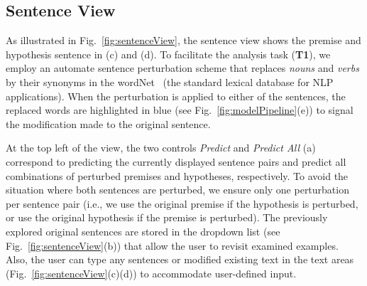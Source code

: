 
\subsection{Sentence View}
\label{sec:sentence}
As illustrated in Fig.~\ref{fig:sentenceView}, the sentence view shows the premise and hypothesis sentence in (c) and (d).
%
To facilitate the analysis task (\textbf{T1}), we employ an automate sentence perturbation scheme that replaces \emph{nouns} and \emph{verbs} by their synonyms in the wordNet~\cite{Miller1995} (the standard lexical database for NLP applications).
%
When the perturbation is applied to either of the sentences, the replaced words are highlighted in blue (see Fig.~\ref{fig:modelPipeline}(e)) to signal the modification made to the original sentence.



At the top left of the view, the two controls \emph{Predict} and \emph{Predict All} (a) correspond to predicting the currently displayed sentence pairs and predict all combinations of perturbed premises and hypotheses, respectively.
%
To avoid the situation where both sentences are perturbed, we ensure only one perturbation per sentence pair (i.e., we use the original premise if the hypothesis is perturbed, or use the original hypothesis if the premise is perturbed).
The previously explored original sentences are stored in the dropdown list (see Fig.~\ref{fig:sentenceView}(b)) that allow the user to revisit examined examples.
Also, the user can type any sentences or modified existing text in the text areas (Fig.~\ref{fig:sentenceView}(c)(d)) to accommodate user-defined input.



